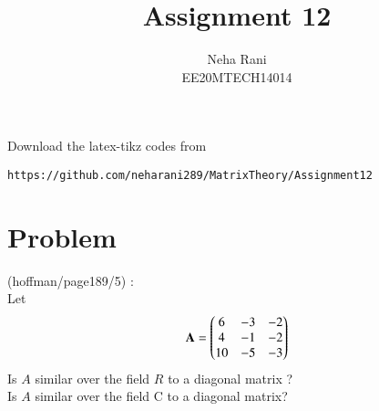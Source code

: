 \documentclass[journal,12pt]{IEEEtran}
\begin{document}
     \def\rightbox#1{\makebox[0in][r]{#1}}
     \def\centbox#1{\makebox[0in]{#1}}
     \def\topbox#1{\raisebox{-\baselineskip}[0in][0in]{#1}}
     \def\midbox#1{\raisebox{-0.5\baselineskip}[0in][0in]{#1}}
\vspace{3cm}
\title{Assignment 12}
\author{Neha Rani\\EE20MTECH14014}
\maketitle
\bigskip
\renewcommand{\thefigure}{\theenumi}
\renewcommand{\thetable}{\theenumi}
%
Download the latex-tikz codes from 
%
\begin{lstlisting}
https://github.com/neharani289/MatrixTheory/Assignment12
\end{lstlisting}
\section{\textbf{Problem}}
(hoffman/page189/5) : \\
%
Let
\begin{align}
\mathbf{A}=\begin{pmatrix}6&-3&-2\\4&-1&-2\\10&-5&-3\end{pmatrix}
\end{align}
Is $A$ similar over the field $R$ to a diagonal matrix ? \\Is $A$ similar over the field C to a diagonal matrix?
%
%
%
\end{document}
